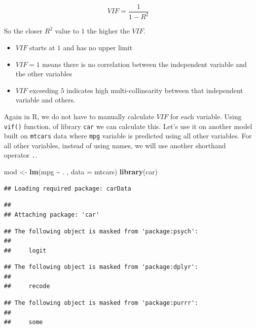 \documentclass[
]{book}
\newenvironment{Shaded}{\begin{snugshade}}{\end{snugshade}}
\newcommand{\AttributeTok}[1]{\textcolor[rgb]{0.13,0.29,0.53}{#1}}
\newcommand{\FunctionTok}[1]{\textcolor[rgb]{0.13,0.29,0.53}{\textbf{#1}}}
\newcommand{\NormalTok}[1]{#1}
\newcommand{\OtherTok}[1]{\textcolor[rgb]{0.56,0.35,0.01}{#1}}
\newcommand{\SpecialCharTok}[1]{\textcolor[rgb]{0.81,0.36,0.00}{\textbf{#1}}}
\providecommand{\tightlist}{%
  \setlength{\itemsep}{0pt}\setlength{\parskip}{0pt}}
\begin{document}
\begin{equation} 
{VIF} = \frac{1}{1-R^2}
\label{eq:lr18}
\end{equation}

So the closer \(R^2\) value to \(1\) the higher the \({VIF}\).

\begin{itemize}
\tightlist
\item
  \(VIF\) starts at \(1\) and has no upper limit
\item
  \({VIF} = 1\) means there is no correlation between the independent variable and the other variables
\item
  \({VIF}\) exceeding \(5\) indicates high multi-collinearity between that independent variable and others.
\end{itemize}

Again in R, we do not have to manually calculate \({VIF}\) for each variable. Using \texttt{vif()} function, of library \texttt{car} we can calculate this. Let's use it on another model built on \texttt{mtcars} data where \texttt{mpg} variable is predicted using all other variables. For all other variables, instead of using names, we will use another shorthand operator \texttt{.}.

\begin{Shaded}
\begin{Highlighting}[]
\NormalTok{mod }\OtherTok{\textless{}{-}} \FunctionTok{lm}\NormalTok{(mpg }\SpecialCharTok{\textasciitilde{}}\NormalTok{ . , }\AttributeTok{data =}\NormalTok{ mtcars)}
\FunctionTok{library}\NormalTok{(car)}
\end{Highlighting}
\end{Shaded}

\begin{verbatim}
## Loading required package: carData
\end{verbatim}

\begin{verbatim}
## 
## Attaching package: 'car'
\end{verbatim}

\begin{verbatim}
## The following object is masked from 'package:psych':
## 
##     logit
\end{verbatim}

\begin{verbatim}
## The following object is masked from 'package:dplyr':
## 
##     recode
\end{verbatim}

\begin{verbatim}
## The following object is masked from 'package:purrr':
## 
##     some
\end{verbatim}
\end{document}
